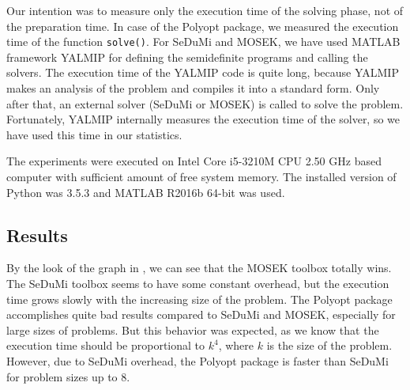 Our intention was to measure only the execution time of the solving phase, not of the preparation time.
In case of the Polyopt package, we measured the execution time of the function \texttt{solve()}.
For SeDuMi and MOSEK, we have used MATLAB framework YALMIP \cite{yalmip} for defining the semidefinite programs and calling the solvers.
The execution time of the YALMIP code is quite long, because YALMIP makes an analysis of the problem and compiles it into a standard form.
Only after that, an external solver (SeDuMi or MOSEK) is called to solve the problem.
Fortunately, YALMIP internally measures the execution time of the solver, so we have used this time in our statistics.

The experiments were executed on Intel Core i5-3210M CPU 2.50 GHz based computer with sufficient amount of free system memory.
The installed version of Python was 3.5.3 and MATLAB R2016b 64-bit was used.

\subsection{Results}
By the look of the graph in , we can see that the MOSEK toolbox totally wins.
The SeDuMi toolbox seems to have some constant overhead, but the execution time grows slowly with the increasing size of the problem.
The Polyopt package accomplishes quite bad results compared to SeDuMi and MOSEK, especially for large sizes of problems.
But this behavior was expected, as we know that the execution time should be proportional to $k^4$, where $k$ is the size of the problem.
However, due to SeDuMi overhead, the Polyopt package is faster than SeDuMi for problem sizes up to 8.
